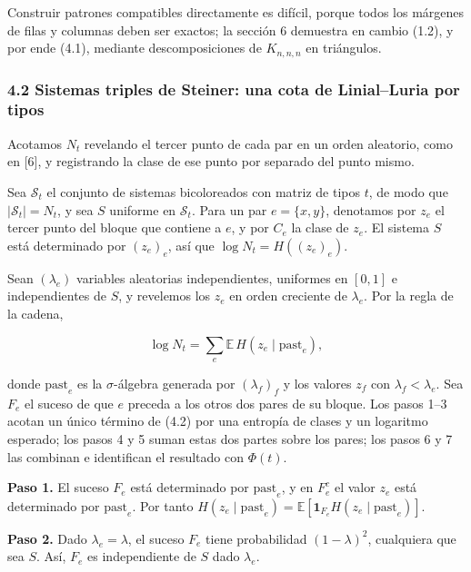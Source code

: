\documentclass[spanish,11pt,a4paper]{article}
\begin{document}
Construir patrones compatibles directamente es difícil, porque todos los márgenes de filas y columnas deben ser exactos; la sección 6 demuestra en cambio (1.2), y por ende (4.1), mediante descomposiciones de \(K_{n,n,n}\) en triángulos.

\subsubsection{4.2 Sistemas triples de Steiner: una cota de Linial--Luria por tipos}\label{sistemas-triples-de-steiner-una-cota-de-linialluria-por-tipos}

Acotamos \(N_t\) revelando el tercer punto de cada par en un orden aleatorio, como en {[}6{]}, y registrando la clase de ese punto por separado del punto mismo.

Sea \(\mathcal S_t\) el conjunto de sistemas bicoloreados con matriz de tipos \(t\), de modo que \(|\mathcal S_t|=N_t\), y sea \(S\) uniforme en \(\mathcal S_t\). Para un par \(e=\{x,y\}\), denotamos por \(z_e\) el tercer punto del bloque que contiene a \(e\), y por \(C_e\) la clase de \(z_e\). El sistema \(S\) está determinado por \((z_e)_e\), así que \(\log N_t=H((z_e)_e)\).

Sean \((\lambda_e)\) variables aleatorias independientes, uniformes en \([0,1]\) e independientes de \(S\), y revelemos los \(z_e\) en orden creciente de \(\lambda_e\). Por la regla de la cadena,

\nopagebreak[4]
\[\log N_t=\sum_e\mathbb E\,H(z_e\mid\mathrm{past}_e),\tag{4.2}\]

donde \(\mathrm{past}_e\) es la \(\sigma\)-álgebra generada por \((\lambda_f)_f\) y los valores \(z_f\) con \(\lambda_f<\lambda_e\). Sea \(F_e\) el suceso de que \(e\) preceda a los otros dos pares de su bloque. Los pasos 1--3 acotan un único término de (4.2) por una entropía de clases y un logaritmo esperado; los pasos 4 y 5 suman estas dos partes sobre los pares; los pasos 6 y 7 las combinan e identifican el resultado con \(\Phi(t)\).

\textbf{Paso 1.} El suceso \(F_e\) está determinado por \(\mathrm{past}_e\), y en \(F_e^c\) el valor \(z_e\) está determinado por \(\mathrm{past}_e\). Por tanto \(H(z_e\mid\mathrm{past}_e)=\mathbb E[\mathbf 1_{F_e}H(z_e\mid\mathrm{past}_e)]\).

\textbf{Paso 2.} Dado \(\lambda_e=\lambda\), el suceso \(F_e\) tiene probabilidad \((1-\lambda)^2\), cualquiera que sea \(S\). Así, \(F_e\) es independiente de \(S\) dado \(\lambda_e\).
\end{document}
